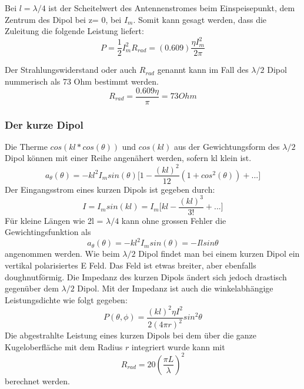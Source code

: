 Bei $l=\lambda/4 $ ist der Scheitelwert des Antennenstromes beim Einspeisepunkt, dem Zentrum des Dipol bei z= 0, bei $I_{m}$. Somit kann gesagt werden, dass die Zuleitung  die folgende Leistung  liefert:
\begin{equation}
P=\frac{1}{2} I_{m}^{2}R_{rad}=(0.609)\frac{\eta I_{m}^{2}}{2\pi}
\end{equation}

Der Strahlungswiderstand oder auch $R_{rad}$ genannt kann im Fall des $\lambda /2$ Dipol nummerisch als 73 Ohm bestimmt werden.
\begin{equation}\label{RradDipol}
R_{rad}=\frac{0.609 \eta}{\pi}= 73 Ohm
\end{equation}
\subsubsection{Der kurze Dipol }\label{sec:kurzerDipol}
Die Therme $cos(kl*cos(\theta)) $ und $cos(kl)$ aus der Gewichtungsform des $\lambda/2$ Dipol können mit einer Reihe angenähert werden, sofern kl klein ist.
\begin{equation}
a_{\theta}(\theta)=-kl^{2}I_{m}sin(\theta) \lbrack 1- \frac{(kl)^{2}}{12}(1+cos^{2}(\theta))+...\rbrack
\end{equation}
Der Eingangsstrom eines kurzen Dipols ist gegeben durch:
\begin{equation}
I=I_{m}sin(kl)=I_{m}\lbrack kl - \frac{(kl)^{3}}{3!} +... \rbrack
\end{equation}
 Für kleine Längen wie 2l = $\lambda/4 $ kann ohne grossen Fehler die Gewichtingsfunktion als 
\begin{equation}
a_{\theta}(\theta)=-kl^{2}I_{m}sin(\theta)=-Ilsin\theta
\end{equation}
angenommen werden.
Wie beim $\lambda/2$ Dipol findet man bei einem kurzen Dipol ein vertikal polarisiertes E Feld. Das Feld ist etwas breiter,  aber ebenfalls doughnutförmig. Die Impedanz des kurzen Dipols ändert sich jedoch drastisch gegenüber dem $\lambda/2$ Dipol. Mit der Impedanz ist auch die winkelabhängige Leistungsdichte wie folgt gegeben:
\begin{equation}
P(\theta,\phi)=\frac{(kl)^{2}\eta I^{2}}{2(4\pi r)^{2}}sin^{2}\theta
\end{equation}
Die abgestrahlte Leistung eines kurzen Dipols bei dem über die ganze Kugeloberfläche mit dem Radius $r$ integriert wurde kann mit
\begin{equation}\label{eq:Rrrad}
R_{rad}=20 \left(\frac{\pi L}{\lambda} \right) ^{2}
\end{equation}
berechnet werden.\\


